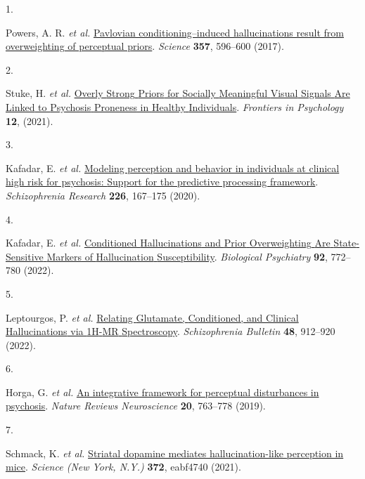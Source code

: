 \documentclass[
]{article}
\newlength{\cslhangindent}
\newlength{\csllabelwidth}
\newlength{\cslentryspacingunit} %
\newenvironment{CSLReferences}[2] %
 {%
  \setlength{\parindent}{0pt}
  \ifodd #1
  \let\oldpar\par
  \def\par{\hangindent=\cslhangindent\oldpar}
  \fi
  \setlength{\parskip}{#2\cslentryspacingunit}
 }%
 {}
\newcommand{\CSLLeftMargin}[1]{\parbox[t]{\csllabelwidth}{#1}}
\newcommand{\CSLRightInline}[1]{\parbox[t]{\linewidth - \csllabelwidth}{#1}\break}
\begin{document}
\hypertarget{refs}{}
\begin{CSLReferences}{0}{0}
\leavevmode{}%
\CSLLeftMargin{1. }%
\CSLRightInline{Powers, A. R. \emph{et al.}
\href{https://doi.org/10.1126/science.aan3458}{Pavlovian
conditioning--induced hallucinations result from overweighting of
perceptual priors}. \emph{Science} \textbf{357}, 596--600 (2017).}

\leavevmode{}%
\CSLLeftMargin{2. }%
\CSLRightInline{Stuke, H. \emph{et al.}
\href{https://doi.org/10.3389/fpsyg.2021.583637}{Overly {Strong}
{Priors} for {Socially} {Meaningful} {Visual} {Signals} {Are} {Linked}
to {Psychosis} {Proneness} in {Healthy} {Individuals}}. \emph{Frontiers
in Psychology} \textbf{12}, (2021).}

\leavevmode{}%
\CSLLeftMargin{3. }%
\CSLRightInline{Kafadar, E. \emph{et al.}
\href{https://doi.org/10.1016/j.schres.2020.04.017}{Modeling perception
and behavior in individuals at clinical high risk for psychosis:
{Support} for the predictive processing framework}. \emph{Schizophrenia
Research} \textbf{226}, 167--175 (2020).}

\leavevmode{}%
\CSLLeftMargin{4. }%
\CSLRightInline{Kafadar, E. \emph{et al.}
\href{https://doi.org/10.1016/j.biopsych.2022.05.007}{Conditioned
{Hallucinations} and {Prior} {Overweighting} {Are} {State}-{Sensitive}
{Markers} of {Hallucination} {Susceptibility}}. \emph{Biological
Psychiatry} \textbf{92}, 772--780 (2022).}

\leavevmode{}%
\CSLLeftMargin{5. }%
\CSLRightInline{Leptourgos, P. \emph{et al.}
\href{https://doi.org/10.1093/schbul/sbac006}{Relating {Glutamate},
{Conditioned}, and {Clinical} {Hallucinations} via {1H}-{MR}
{Spectroscopy}}. \emph{Schizophrenia Bulletin} \textbf{48}, 912--920
(2022).}

\leavevmode{}%
\CSLLeftMargin{6. }%
\CSLRightInline{Horga, G. \emph{et al.}
\href{https://doi.org/10.1038/s41583-019-0234-1}{An integrative
framework for perceptual disturbances in psychosis}. \emph{Nature
Reviews Neuroscience} \textbf{20}, 763--778 (2019).}

\leavevmode{}%
\CSLLeftMargin{7. }%
\CSLRightInline{Schmack, K. \emph{et al.}
\href{https://doi.org/10.1126/science.abf4740}{Striatal dopamine
mediates hallucination-like perception in mice}. \emph{Science (New
York, N.Y.)} \textbf{372}, eabf4740 (2021).}


\end{CSLReferences}
\end{document}
